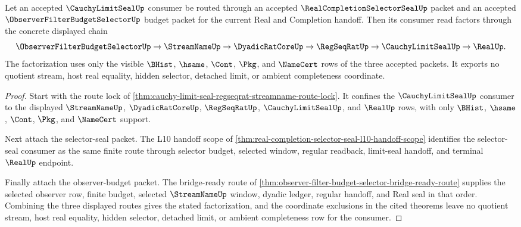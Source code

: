 \begin{theorem}
\label{thm:real-completion-seal-selector-consumer-factorization}
Let an accepted $\CauchyLimitSealUp$ consumer be routed through an accepted $\RealCompletionSelectorSealUp$ packet and an accepted $\ObserverFilterBudgetSelectorUp$ budget packet for the current Real and Completion handoff. Then its consumer read factors through the concrete displayed chain
$$
\ObserverFilterBudgetSelectorUp \to \StreamNameUp \to \DyadicRatCoreUp \to \RegSeqRatUp \to \CauchyLimitSealUp \to \RealUp.
$$
The factorization uses only the visible $\BHist$, $\hsame$, $\Cont$, $\Pkg$, and $\NameCert$ rows of the three accepted packets. It exports no quotient stream, host real equality, hidden selector, detached limit, or ambient completeness coordinate.
\end{theorem}
\begin{proof}
Start with the route lock of \autoref{thm:cauchy-limit-seal-regseqrat-streamname-route-lock}. It confines the $\CauchyLimitSealUp$ consumer to the displayed $\StreamNameUp$, $\DyadicRatCoreUp$, $\RegSeqRatUp$, $\CauchyLimitSealUp$, and $\RealUp$ rows, with only $\BHist$, $\hsame$, $\Cont$, $\Pkg$, and $\NameCert$ support.

Next attach the selector-seal packet. The L10 handoff scope of \autoref{thm:real-completion-selector-seal-l10-handoff-scope} identifies the selector-seal consumer as the same finite route through selector budget, selected window, regular readback, limit-seal handoff, and terminal $\RealUp$ endpoint.

Finally attach the observer-budget packet. The bridge-ready route of \autoref{thm:observer-filter-budget-selector-bridge-ready-route} supplies the selected observer row, finite budget, selected $\StreamNameUp$ window, dyadic ledger, regular handoff, and Real seal in that order. Combining the three displayed routes gives the stated factorization, and the coordinate exclusions in the cited theorems leave no quotient stream, host real equality, hidden selector, detached limit, or ambient completeness row for the consumer.
\end{proof}

